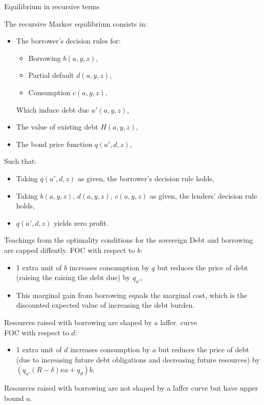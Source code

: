 \documentclass{beamer}
\begin{document}
\begin{frame}{Equilibrium in recursive terms}

The recursive Markov equilibrium consists in:
    \begin{itemize}
        \item The borrower's decision rules for:
        \begin{itemize}
            \item Borrowing \(b(a,y,z)\),
            \item Partial default \(d(a,y,z)\),
            \item Consumption \(c(a,y,z)\),
        \end{itemize} 
        Which induce debt due \(a'(a,y,z)\),
        \item The value of existing debt \(H(a,y,z)\),
        \item The bond price function \(q(a',d,z)\),  
    \end{itemize}
Such that:
\begin{itemize}
    \item Taking \(q(a',d,z)\) as given, the borrower's decision rule holds,
    \item Taking \(b(a,y,z)\), \(d(a,y,z)\), \(c(a,y,z)\) as given, the lenders' decision rule holds,
    \item \(q(a',d,z)\) yields zero profit. 
\end{itemize}    
\end{frame}

\begin{frame}{Teachings from the optimality conditions for the sovereign}
Debt and borrowing are capped diffently.
\bigbreak
FOC with respect to \(b\):
\begin{itemize}
    \item 1 extra unit of \(b\) increases consumption by \(q\) but reduces the price of debt (raising the raising the debt due) by \(q_{a'}\),
    \item This marginal gain from borrowing equals the marginal cost, which is the discounted expected value of increasing the debt burden.
\end{itemize}
Resources raised with borrowing are shaped by a laffer. curve\\

\bigbreak
FOC with respect to \(d\):
\begin{itemize}
    \item 1 extra unit of \(d\) increases consumption by \(a\) but reduces the price of debt (due to increasing future debt obligations and decreasing future resources) by \((q_{a'}(R-\delta)\kappa a + q_d)b\).
\end{itemize}
Resources raised with borrowing are not shaped by a laffer curve but have upper bound \(a\).

\end{frame}
\end{document}
